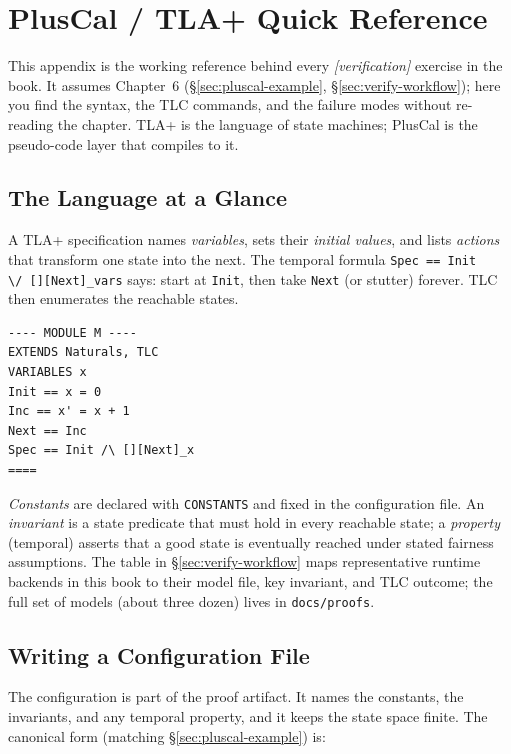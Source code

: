 \chapter{PlusCal / TLA+ Quick Reference}
\label{chap:pluscal-quick-ref}

This appendix is the working reference behind every \emph{[verification]}
exercise in the book.  It assumes Chapter~6 (\S\ref{sec:pluscal-example},
\S\ref{sec:verify-workflow}); here you find the syntax, the TLC commands,
and the failure modes without re-reading the chapter.  TLA+ is the language
of state machines; PlusCal is the pseudo-code layer that compiles to it.

\section{The Language at a Glance}

A TLA+ specification names \emph{variables}, sets their \emph{initial
values}, and lists \emph{actions} that transform one state into the next.
The temporal formula \texttt{Spec == Init \textbackslash/\ [][Next]\_vars}
says: start at \texttt{Init}, then take \texttt{Next} (or stutter)
forever.  TLC then enumerates the reachable states.

\begin{lstlisting}[language={}, caption={A minimal TLA+ state machine.}]
---- MODULE M ----
EXTENDS Naturals, TLC
VARIABLES x
Init == x = 0
Inc == x' = x + 1
Next == Inc
Spec == Init /\ [][Next]_x
====
\end{lstlisting}

\emph{Constants} are declared with \texttt{CONSTANTS} and fixed in the
configuration file.  An \emph{invariant} is a state predicate that must hold
in every reachable state; a \emph{property} (temporal) asserts that a good
state is eventually reached under stated fairness assumptions.  The table in
\S\ref{sec:verify-workflow} maps representative runtime backends in this book
to their model file, key invariant, and TLC outcome; the full set of models
(about three dozen) lives in \texttt{docs/proofs}.

\section{Writing a Configuration File}

The configuration is part of the proof artifact.  It names the constants,
the invariants, and any temporal property, and it keeps the state space
finite.  The canonical form (matching \S\ref{sec:pluscal-example}) is:

